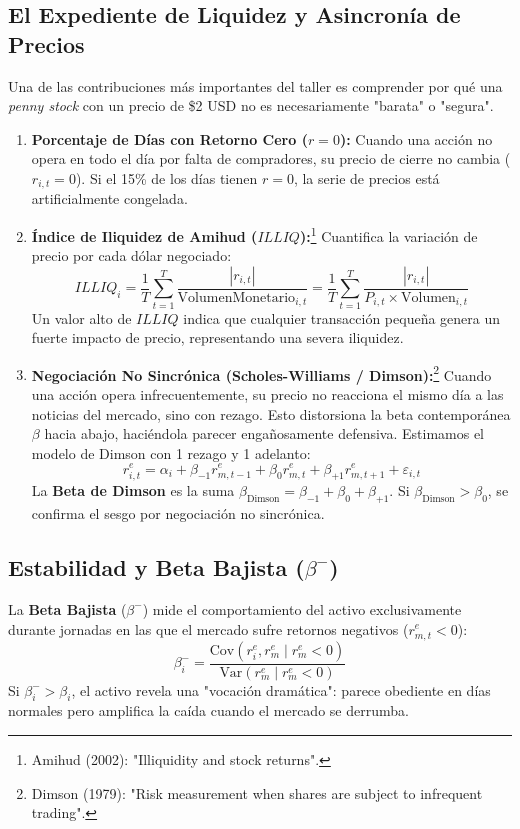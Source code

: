 \documentclass[11pt,a4paper]{article}
\begin{document}
\subsection{El Expediente de Liquidez y Asincronía de Precios}
Una de las contribuciones más importantes del taller es comprender por qué una \textit{penny stock} con un precio de \$2 USD no es necesariamente "barata" o "segura".

\begin{enumerate}
    \item \textbf{Porcentaje de Días con Retorno Cero ($r=0$):} Cuando una acción no opera en todo el día por falta de compradores, su precio de cierre no cambia ($r_{i,t}=0$). Si el 15\% de los días tienen $r=0$, la serie de precios está artificialmente congelada.
    \item \textbf{Índice de Iliquidez de Amihud ($ILLIQ$):}\footnote{Amihud (2002): "Illiquidity and stock returns".} Cuantifica la variación de precio por cada dólar negociado:
    \begin{equation}
    ILLIQ_i = \frac{1}{T} \sum_{t=1}^T \frac{|r_{i,t}|}{\text{VolumenMonetario}_{i,t}} = \frac{1}{T} \sum_{t=1}^T \frac{|r_{i,t}|}{P_{i,t} \times \text{Volumen}_{i,t}}
    \end{equation}
    Un valor alto de $ILLIQ$ indica que cualquier transacción pequeña genera un fuerte impacto de precio, representando una severa iliquidez.
    \item \textbf{Negociación No Sincrónica (Scholes-Williams / Dimson):}\footnote{Dimson (1979): "Risk measurement when shares are subject to infrequent trading".} Cuando una acción opera infrecuentemente, su precio no reacciona el mismo día a las noticias del mercado, sino con rezago. Esto distorsiona la beta contemporánea $\beta$ hacia abajo, haciéndola parecer engañosamente defensiva. Estimamos el modelo de Dimson con 1 rezago y 1 adelanto:
    \begin{equation}
    r_{i,t}^e = \alpha_i + \beta_{-1} r_{m,t-1}^e + \beta_0 r_{m,t}^e + \beta_{+1} r_{m,t+1}^e + \varepsilon_{i,t}
    \end{equation}
    La \textbf{Beta de Dimson} es la suma $\beta_{\text{Dimson}} = \beta_{-1} + \beta_0 + \beta_{+1}$. Si $\beta_{\text{Dimson}} > \beta_0$, se confirma el sesgo por negociación no sincrónica.
\end{enumerate}

\subsection{Estabilidad y Beta Bajista ($\beta^-$)}
La \textbf{Beta Bajista} ($\beta^-$) mide el comportamiento del activo exclusivamente durante jornadas en las que el mercado sufre retornos negativos ($r_{m,t}^e < 0$):
\begin{equation}
\beta_i^- = \frac{\text{Cov}(r_i^e, r_m^e \mid r_m^e < 0)}{\text{Var}(r_m^e \mid r_m^e < 0)}
\end{equation}
Si $\beta_i^- > \beta_i$, el activo revela una "vocación dramática": parece obediente en días normales pero amplifica la caída cuando el mercado se derrumba.
\end{document}
